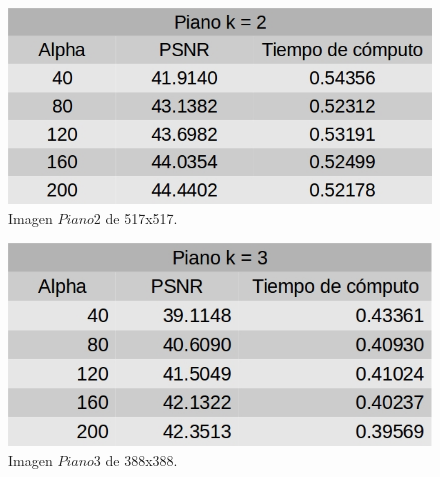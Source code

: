 \documentclass[a4paper]{article}
\begin{document}
    
    \begin{figure}[H]
    \centering
    \includegraphics[scale=0.4]{imagenes/piano2.jpg}
    \caption{Imagen $Piano2$ de 517x517.}
	\label{piano2}
    \end{figure}
    
     \begin{figure}[H]
    \centering
    \includegraphics[scale=0.4]{imagenes/piano3.jpg}
    \caption{Imagen $Piano3$ de 388x388.}
	\label{piano3}
    \end{figure}
    
\end{document}
